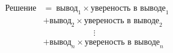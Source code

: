 \documentclass[preview]{standalone}
\begin{document}
\begin{align*}
\text{Решение}&=\  \text{вывод}_1 \times \text{увереность в выводе}_1\\ &+\text{вывод}_2 \times \text{увереность в выводе}_2\\ &\qquad\qquad\qquad\vdots\\ &+\text{вывод}_n \times \text{увереность в выводе}_n\\
\end{align*}
\end{document}
